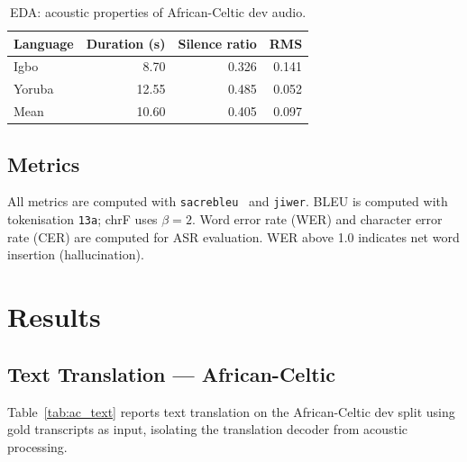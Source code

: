 \documentclass[10pt,twocolumn]{article}
\begin{document}
\begin{table}[H]
\centering
\caption{EDA: acoustic properties of African-Celtic dev audio.}
\label{tab:eda}
\small
\setlength{\tabcolsep}{3pt}
\begin{tabular}{lrrr}
\toprule
\textbf{Language} & \textbf{Duration (s)} & \textbf{Silence ratio} & \textbf{RMS} \\
\midrule
Igbo    & 8.70  & 0.326 & 0.141 \\
Yoruba  & 12.55 & 0.485 & 0.052 \\
\midrule
Mean    & 10.60 & 0.405 & 0.097 \\
\bottomrule
\end{tabular}
\end{table}

\subsection{Metrics}

All metrics are computed with \texttt{sacrebleu}~\cite{post2018sacrebleu}
and \texttt{jiwer}.
BLEU is computed with tokenisation \texttt{13a}; chrF uses
$\beta=2$.
Word error rate (WER) and character error rate (CER) are
computed for ASR evaluation.
WER above 1.0 indicates net word insertion (hallucination).

\section{Results}

\subsection{Text Translation --- African-Celtic}
\label{sec:ac_text}

Table~\ref{tab:ac_text} reports text translation on the
African-Celtic dev split using gold transcripts as input,
isolating the translation decoder from acoustic processing.
\end{document}
